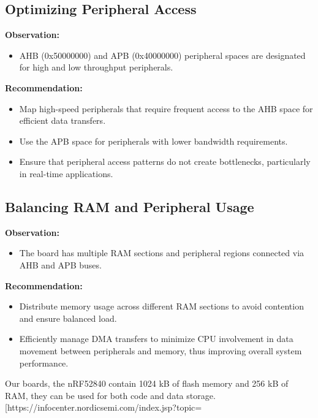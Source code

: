 \documentclass{Configuration_Files/PoliMi3i_thesis}
\begin{document}
\subsection{Optimizing Peripheral Access}
\textbf{Observation:}
\begin{itemize}
    \item AHB (0x50000000) and APB (0x40000000) peripheral spaces are designated for high and low throughput peripherals.
\end{itemize}

\textbf{Recommendation:}
\begin{itemize}
    \item Map high-speed peripherals that require frequent access to the AHB space for efficient data transfers.
    \item Use the APB space for peripherals with lower bandwidth requirements.
    \item Ensure that peripheral access patterns do not create bottlenecks, particularly in real-time applications.
\end{itemize}

\subsection{Balancing RAM and Peripheral Usage}
\textbf{Observation:}
\begin{itemize}
    \item The board has multiple RAM sections and peripheral regions connected via AHB and APB buses.
\end{itemize}

\textbf{Recommendation:}
\begin{itemize}
    \item Distribute memory usage across different RAM sections to avoid contention and ensure balanced load.
    \item Efficiently manage DMA transfers to minimize CPU involvement in data movement between peripherals and memory, thus improving overall system performance.
\end{itemize}






Our boards, the nRF52840 contain 1024 kB of flash memory and 256 kB of RAM, they can be used for both code and data storage. [https://infocenter.nordicsemi.com/index.jsp?topic=%
\end{document}
